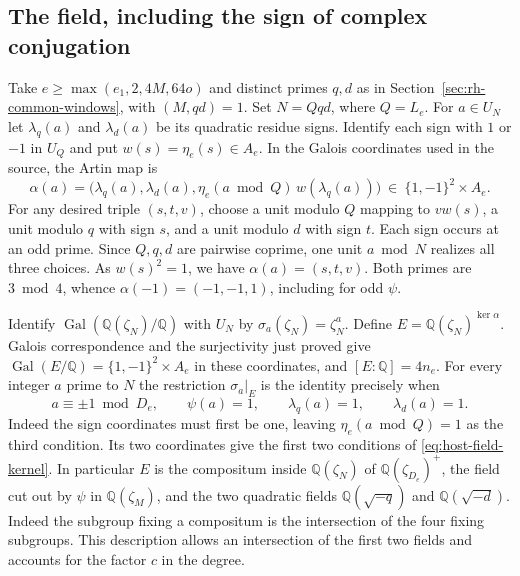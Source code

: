 \subsection{The field, including the sign of complex conjugation}

Take $e\ge\max(e_1,2,4M,64o)$ and distinct primes $q,d$ as in
Section~\ref{sec:rh-common-windows}, with $(M,qd)=1$.
Set $N=Qqd$, where $Q=L_e$. For $a\in U_N$ let $\lambda_q(a)$ and
$\lambda_d(a)$ be its quadratic residue signs. Identify each sign with
$1$ or $-1$ in $U_Q$ and put $w(s)=\eta_e(s)\in A_e$.
In the Galois coordinates used in the source, the Artin map is
\[
 \alpha(a)=\bigl(\lambda_q(a),\lambda_d(a),
           \eta_e(a\bmod Q)\,w(\lambda_q(a))\bigr)
       \ \in\ \{1,-1\}^2\times A_e .
\]
For any desired triple $(s,t,v)$, choose a unit modulo $Q$ mapping to
$v w(s)$, a unit modulo $q$ with sign $s$, and a unit modulo $d$ with
sign $t$. Each sign occurs at an odd prime. Since $Q,q,d$ are
pairwise coprime, one unit $a\bmod N$ realizes all three choices.
As $w(s)^2=1$, we have $\alpha(a)=(s,t,v)$. Both primes are
$3\bmod4$, whence $\alpha(-1)=(-1,-1,1)$, including for odd $\psi$.

Identify $\operatorname{Gal}(\mathbb Q(\zeta_N)/\mathbb Q)$ with
$U_N$ by $\sigma_a(\zeta_N)=\zeta_N^a$. Define
$E=\mathbb Q(\zeta_N)^{\ker\alpha}$. Galois correspondence and the
surjectivity just proved give $\operatorname{Gal}(E/\mathbb Q)
=\{1,-1\}^2\times A_e$ in these coordinates, and $[E:\mathbb Q]=4n_e$.
For every integer $a$ prime to $N$ the restriction $\sigma_a|_E$
is the identity precisely when
\begin{equation}
\label{eq:host-field-kernel}
 a\equiv\pm1\bmod D_e,\qquad \psi(a)=1,\qquad
 \lambda_q(a)=1,\qquad\lambda_d(a)=1.
\end{equation}
Indeed the sign coordinates must first be one, leaving
$\eta_e(a\bmod Q)=1$ as the third condition. Its two coordinates give
the first two conditions of \eqref{eq:host-field-kernel}.
In particular $E$ is the compositum inside $\mathbb Q(\zeta_N)$
of $\mathbb Q(\zeta_{D_e})^+$, the field cut out by $\psi$ in
$\mathbb Q(\zeta_M)$, and the two quadratic fields
$\mathbb Q(\sqrt{-q})$ and $\mathbb Q(\sqrt{-d})$. Indeed the
subgroup fixing a compositum is the intersection of the four fixing
subgroups. This description allows an intersection of the first
two fields and accounts for the factor $c$ in the degree.

